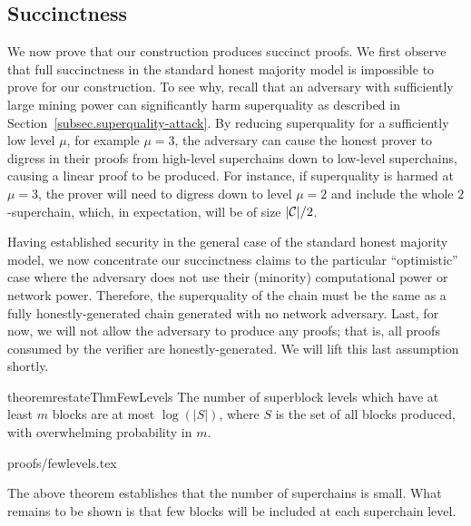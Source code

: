 \label{sec.succinctness}

\subsection{Succinctness}
We now prove that our construction produces succinct proofs.
%
We first observe that full succinctness in the standard honest majority model is
impossible to prove for our construction. To see why, recall that an adversary
with sufficiently large mining power can significantly harm superquality as
described in %
Section~\ref{subsec.superquality-attack}. By reducing
 superquality for a sufficiently low level $\mu$, for example $\mu = 3$, the
adversary can cause the honest prover to digress in their proofs from high-level
superchains down to low-level superchains, causing a linear proof to be
produced.
For instance, if superquality is harmed at $\mu = 3$, the prover will
need to digress down to level $\mu = 2$ and include the whole $2$-superchain,
which, in expectation, will be of size $|\mathcal{C}|/2$.

Having established security in the general case of the standard honest majority
model, we now concentrate our succinctness claims to the particular
``optimistic'' case where the adversary does not use their (minority)
computational power or network power. Therefore, the superquality of the chain
must be the same as a fully honestly-generated chain generated with no network
adversary. Last, for now, we will not allow the adversary to produce any proofs;
that is, all proofs consumed by the verifier are honestly-generated. We will
lift this last assumption shortly.

\begin{restatable}{theorem}{restateThmFewLevels}
    \label{thm.few-levels}
    The number of superblock levels which have at least $m$ blocks are at most
    $\log(|S|)$, where $S$ is the set of all blocks produced, with overwhelming
    probability in $m$.
\end{restatable}

\ifonecolumn
{proofs/fewlevels.tex}
\fi

The above theorem establishes that the number of superchains is small. What
remains to be shown is that few blocks will be included at each superchain
level.

